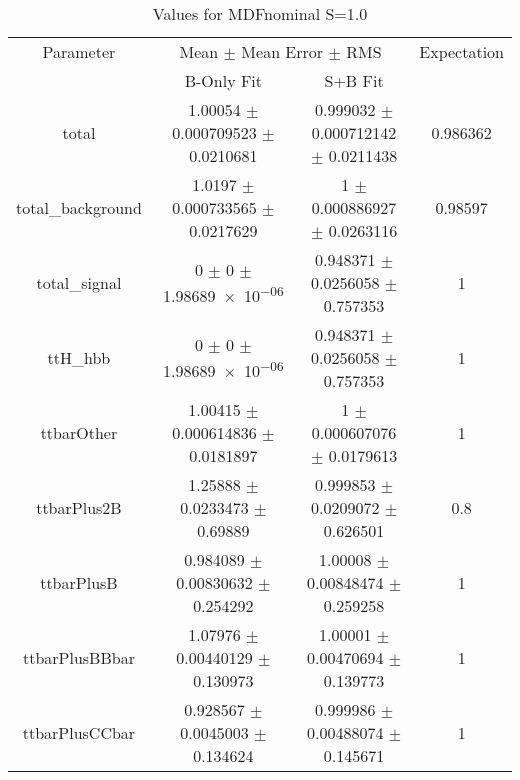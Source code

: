 \begin{table}
\centering
\caption{Values for MDFnominal S=1.0}
\begin{tabular}{cccc}
\toprule
Parameter & \multicolumn{2}{c}{Mean $\pm$ Mean Error $\pm$ RMS} & Expectation\\
 & B-Only Fit & S+B Fit & \\
\midrule
total & \num{1.00054} $\pm$ \num{0.000709523} $\pm$ \num{0.0210681} & \num{0.999032} $\pm$ \num{0.000712142} $\pm$ \num{0.0211438} & \num{0.986362}\\
total\_background & \num{1.0197} $\pm$ \num{0.000733565} $\pm$ \num{0.0217629} & \num{1} $\pm$ \num{0.000886927} $\pm$ \num{0.0263116} & \num{0.98597}\\
total\_signal & \num{0} $\pm$ \num{0} $\pm$ \num{1.98689e-06} & \num{0.948371} $\pm$ \num{0.0256058} $\pm$ \num{0.757353} & \num{1}\\
ttH\_hbb & \num{0} $\pm$ \num{0} $\pm$ \num{1.98689e-06} & \num{0.948371} $\pm$ \num{0.0256058} $\pm$ \num{0.757353} & \num{1}\\
ttbarOther & \num{1.00415} $\pm$ \num{0.000614836} $\pm$ \num{0.0181897} & \num{1} $\pm$ \num{0.000607076} $\pm$ \num{0.0179613} & \num{1}\\
ttbarPlus2B & \num{1.25888} $\pm$ \num{0.0233473} $\pm$ \num{0.69889} & \num{0.999853} $\pm$ \num{0.0209072} $\pm$ \num{0.626501} & \num{0.8}\\
ttbarPlusB & \num{0.984089} $\pm$ \num{0.00830632} $\pm$ \num{0.254292} & \num{1.00008} $\pm$ \num{0.00848474} $\pm$ \num{0.259258} & \num{1}\\
ttbarPlusBBbar & \num{1.07976} $\pm$ \num{0.00440129} $\pm$ \num{0.130973} & \num{1.00001} $\pm$ \num{0.00470694} $\pm$ \num{0.139773} & \num{1}\\
ttbarPlusCCbar & \num{0.928567} $\pm$ \num{0.0045003} $\pm$ \num{0.134624} & \num{0.999986} $\pm$ \num{0.00488074} $\pm$ \num{0.145671} & \num{1}\\
\bottomrule
\end{tabular}
\end{table}